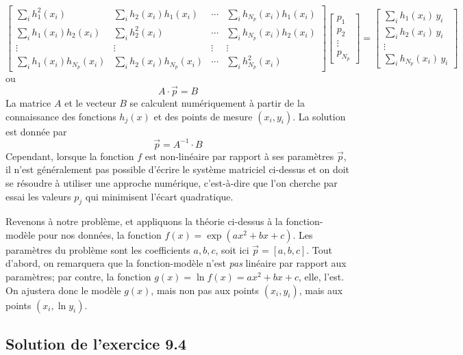 \begin{equation*}
\begin{bmatrix}
\sum_i h_1^2(x_i)       & \sum_i h_2(x_i)h_1(x_i) & \cdots & \sum_i h_{N_p}(x_i)h_1(x_i)\\
\sum_i h_1(x_i)h_2(x_i) & \sum_i h_2^2(x_i)       & \cdots & \sum_i h_{N_p}(x_i)h_2(x_i)\\
\vdots & \vdots & \vdots & \vdots \\
\sum_i h_1(x_i)h_{N_p}(x_i) & \sum_i h_2(x_i)h_{N_p}(x_i) & \cdots & \sum_i h_{N_p}^2(x_i)
\end{bmatrix}
\begin{bmatrix} p_1 \\ p_2 \\ \vdots \\ p_{N_p}\end{bmatrix}=
\begin{bmatrix}
\sum_ih_1(x_i)\,y_i\\
\sum_ih_2(x_i)\,y_i\\
\vdots\\
\sum_ih_{N_p}(x_i)\,y_i
\end{bmatrix}
\end{equation*}
ou
$$
A\cdot\vec{p}=B
$$
La matrice $A$ et le vecteur $B$ se calculent numériquement à partir de la connaissance des fonctions $h_j(x)$ et des points de mesure $(x_i,y_i)$. La solution est donnée par
$$
\vec{p}=A^{-1}\cdot B
$$
Cependant, lorsque la fonction $f$ est non-linéaire par rapport à ses paramètres $\vec{p}$, il n'est généralement pas possible d'écrire le système matriciel ci-dessus et on doit se résoudre à utiliser une approche numérique, c'est-à-dire que l'on cherche par essai les valeurs $p_j$ qui minimisent l'écart quadratique.

Revenons à notre problème, et appliquons la théorie ci-dessus à la fonction-modèle pour nos données, la fonction $f(x)=\exp{(ax^2+bx+c)}$. Les paramètres du problème sont les coefficients $a,b,c$, soit ici $\vec{p}=[a,b,c]$. Tout d'abord, on remarquera que la fonction-modèle n'est \textit{pas} linéaire par rapport aux paramètres; par contre, la fonction $g(x)=\ln{f(x)}=ax^2+bx+c$, elle, l'est. On ajustera donc le modèle $g(x)$, mais non pas aux points $(x_i,y_i)$, mais aux points $(x_i,\ln{y_i})$.

\subsection*{Solution de l'exercice 9.4}

